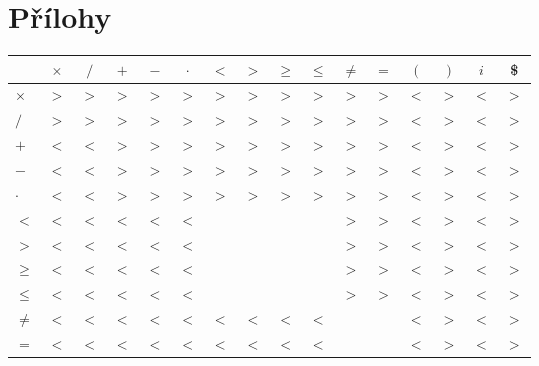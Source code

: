 \documentclass[a4paper, 12pt]{article}
\begin{document}
    \section{Přílohy}
    \begin{table}[h]
        \centering
        \begin{tabular}[p]{| l | c | c | c | c | c | c | c | c | c | c | c | c | c | c | c |}
            \hline
            &   \textbf{$\times$} & \textbf{$/$} & \textbf{$+$} & \textbf{$-$} & \textbf{$\cdot$} & \textbf{$<$} & \textbf{$>$} & \textbf{{$\geq$}} & \textbf{$\leq$} & \textbf{$\neq$} & \textbf{$=$} & \textbf{$($} & \textbf{$)$} & \textbf{$i$} & \textbf{\$} \\
            \hline
            \textbf{$\times$} &
                $>$ & $>$ & $>$ & $>$ & $>$ & $>$ & $>$ & $>$ & $>$ & $>$ & $>$ & $<$ & $>$ & $<$ & $>$ \\
            \textbf{$/$} &
                $>$ & $>$ & $>$ & $>$ & $>$ & $>$ & $>$ & $>$ & $>$ & $>$ & $>$ & $<$ & $>$ & $<$ & $>$ \\
            \textbf{$+$} &
                $<$ & $<$ & $>$ & $>$ & $>$ & $>$ & $>$ & $>$ & $>$ & $>$ & $>$ & $<$ & $>$ & $<$ & $>$ \\
            \textbf{$-$} &
                $<$ & $<$ & $>$ & $>$ & $>$ & $>$ & $>$ & $>$ & $>$ & $>$ & $>$ & $<$ & $>$ & $<$ & $>$ \\
            \textbf{$\cdot$} &
                $<$ & $<$ & $>$ & $>$ & $>$ & $>$ & $>$ & $>$ & $>$ & $>$ & $>$ & $<$ & $>$ & $<$ & $>$ \\
            \textbf{$<$} &
                $<$ & $<$ & $<$ & $<$ & $<$ &     &     &     &     & $>$ & $>$ & $<$ & $>$ & $<$ & $>$ \\
            \textbf{$>$} &
                $<$ & $<$ & $<$ & $<$ & $<$ &     &     &     &     & $>$ & $>$ & $<$ & $>$ & $<$ & $>$ \\
            \textbf{$\geq$} &
                $<$ & $<$ & $<$ & $<$ & $<$ &     &     &     &     & $>$ & $>$ & $<$ & $>$ & $<$ & $>$ \\
            \textbf{$\leq$} &
                $<$ & $<$ & $<$ & $<$ & $<$ &     &     &     &     & $>$ & $>$ & $<$ & $>$ & $<$ & $>$ \\
            \textbf{$\neq$} &
                $<$ & $<$ & $<$ & $<$ & $<$ & $<$ & $<$ & $<$ & $<$ &     &     & $<$ & $>$ & $<$ & $>$ \\
            \textbf{$=$} &
                $<$ & $<$ & $<$ & $<$ & $<$ & $<$ & $<$ & $<$ & $<$ &     &     & $<$ & $>$ & $<$ & $>$ \\

\end{tabular}
\end{table}
\end{document}
